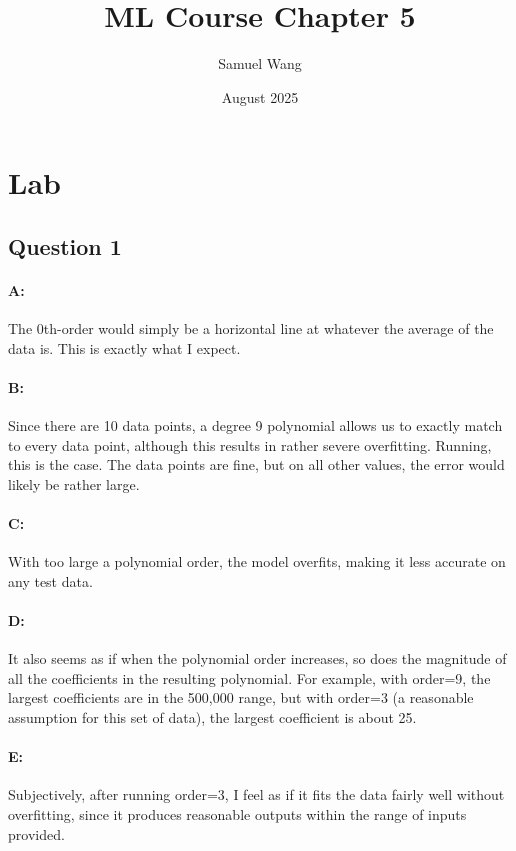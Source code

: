 \documentclass{article}
\title{ML Course Chapter 5}
\author{Samuel Wang}
\date{August 2025}
\begin{document}
\maketitle

\section{Lab}

\subsection{Question 1}

\paragraph{A: } The 0th-order would simply be a horizontal line at whatever the average of the data is. This is exactly what I expect.

\paragraph{B: } Since there are 10 data points, a degree 9 polynomial allows us to exactly match to every data point, although this results in rather severe overfitting. Running, this is the case. The data points are fine, but on all other values, the error would likely be rather large.

\paragraph{C: } With too large a polynomial order, the model overfits, making it less accurate on any test data.

\paragraph{D: } It also seems as if when the polynomial order increases, so does the magnitude of all the coefficients in the resulting polynomial. For example, with order=9, the largest coefficients are in the 500,000 range, but with order=3 (a reasonable assumption for this set of data), the largest coefficient is about 25.

\paragraph{E: } Subjectively, after running order=3, I feel as if it fits the data fairly well without overfitting, since it produces reasonable outputs within the range of inputs provided.
\end{document}
